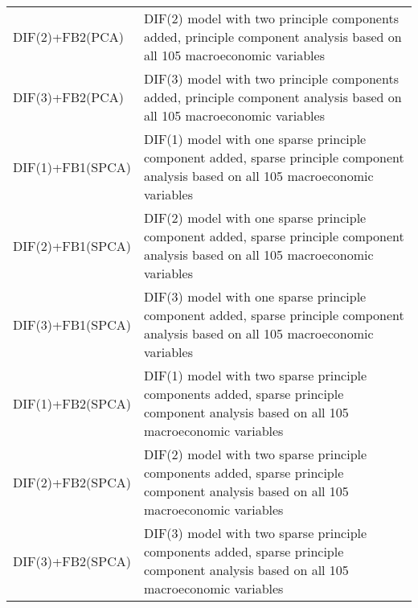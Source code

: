 \begin{footnotesize}
\begin{tabularx}{\linewidth}{lX}
DIF(2)+FB2(PCA)           & DIF(2) model with two principle components added, principle component analysis based on all 105 macroeconomic variables \\
DIF(3)+FB2(PCA)           & DIF(3) model with two principle components added, principle component analysis based on all 105 macroeconomic variables \\
DIF(1)+FB1(SPCA)          & DIF(1) model with one sparse principle component added, sparse principle component analysis based on all 105 macroeconomic variables \\
DIF(2)+FB1(SPCA)          & DIF(2) model with one sparse principle component added, sparse principle component analysis based on all 105 macroeconomic variables \\
DIF(3)+FB1(SPCA)          & DIF(3) model with one sparse principle component added, sparse principle component analysis based on all 105 macroeconomic variables \\
DIF(1)+FB2(SPCA)          & DIF(1) model with two sparse principle components added, sparse principle component analysis based on all 105 macroeconomic variables \\
DIF(2)+FB2(SPCA)          & DIF(2) model with two sparse principle components added, sparse principle component analysis based on all 105 macroeconomic variables \\
DIF(3)+FB2(SPCA)          & DIF(3) model with two sparse principle components added, sparse principle component analysis based on all 105 macroeconomic variables
\end{tabularx}
\end{footnotesize}